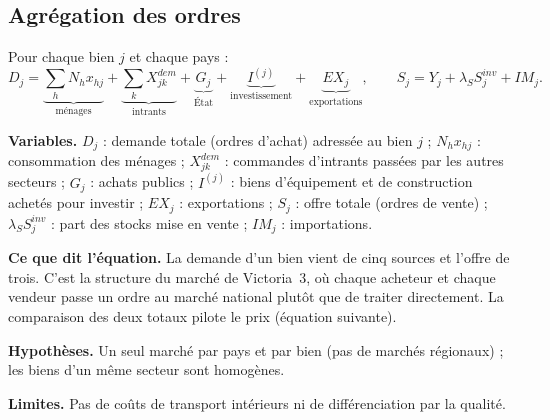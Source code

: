 \documentclass[11pt,a4paper]{article}
\newcommand{\variables}{\par\noindent\textbf{Variables.} }
\newcommand{\sens}{\par\noindent\textbf{Ce que dit l'équation.} }
\newcommand{\hyp}{\par\noindent\textbf{Hypothèses.} }
\newcommand{\limites}{\par\noindent\textbf{Limites.} }
\begin{document}
\subsection{Agrégation des ordres}
Pour chaque bien $j$ et chaque pays :
\begin{equation}
D_j = \underbrace{\sum_h N_h x_{hj}}_{\text{ménages}} + \underbrace{\sum_k X^{dem}_{jk}}_{\text{intrants}} + \underbrace{G_j}_{\text{État}} + \underbrace{I^{(j)}}_{\text{investissement}} + \underbrace{EX_j}_{\text{exportations}},
\qquad
S_j = Y_j + \lambda_S S^{inv}_j + IM_j .
\end{equation}
\begin{lecture}
\variables $D_j$ : demande totale (ordres d'achat) adressée au bien $j$ ; $N_h x_{hj}$ : consommation des ménages ; $X^{dem}_{jk}$ : commandes d'intrants passées par les autres secteurs ; $G_j$ : achats publics ; $I^{(j)}$ : biens d'équipement et de construction achetés pour investir ; $EX_j$ : exportations ; $S_j$ : offre totale (ordres de vente) ; $\lambda_S S^{inv}_j$ : part des stocks mise en vente ; $IM_j$ : importations.
\sens La demande d'un bien vient de cinq sources et l'offre de trois. C'est la structure du marché de Victoria~3, où chaque acheteur et chaque vendeur passe un ordre au marché national plutôt que de traiter directement. La comparaison des deux totaux pilote le prix (équation suivante).
\hyp Un seul marché par pays et par bien (pas de marchés régionaux) ; les biens d'un même secteur sont homogènes.
\limites Pas de coûts de transport intérieurs ni de différenciation par la qualité.
\end{lecture}
\end{document}
